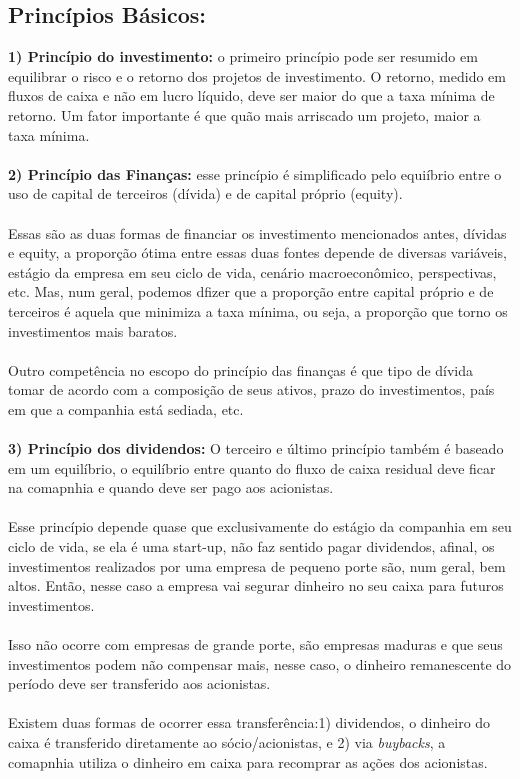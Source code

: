 \subsection*{Princípios Básicos:}
\textbf{1) Princípio do investimento:} o primeiro princípio pode ser resumido em equilibrar o risco e o retorno dos projetos de investimento. O retorno, medido em fluxos de caixa e não em lucro líquido, deve ser maior do que a taxa mínima de retorno. Um fator importante é que quão mais arriscado um projeto, maior a taxa mínima.
\\~\\
\textbf{2) Princípio das Finanças:} esse princípio é simplificado pelo equiíbrio entre o uso de capital de terceiros (dívida) e de capital próprio (equity).
\\~\\
Essas são as duas formas de financiar os investimento mencionados antes, dívidas e equity, a proporção ótima entre essas duas fontes depende de diversas variáveis, estágio da empresa em seu ciclo de vida, cenário macroeconômico, perspectivas, etc. Mas, num geral, podemos dfizer que a proporção entre capital próprio e de terceiros é aquela que minimiza a taxa mínima, ou seja, a proporção que torno os investimentos mais baratos.
\\~\\
Outro competência no escopo do princípio das finanças é que tipo de dívida tomar de acordo com a composição de seus ativos, prazo do investimentos, país em que a companhia está sediada, etc.
\\~\\
\textbf{3) Princípio dos dividendos: } O terceiro e último princípio também é baseado em um equilíbrio, o equilíbrio entre quanto do fluxo de caixa residual deve ficar na comapnhia e quando deve ser pago aos acionistas.
\\~\\
Esse princípio depende quase que exclusivamente do estágio da companhia em seu ciclo de vida, se ela é uma start-up, não faz sentido pagar dividendos, afinal, os investimentos realizados por uma empresa de pequeno porte são, num geral, bem altos. Então, nesse caso a empresa vai segurar dinheiro no seu caixa para futuros investimentos.
\\~\\
Isso não ocorre com empresas de grande porte, são empresas maduras e que seus investimentos podem não compensar mais, nesse caso, o dinheiro remanescente do período deve ser transferido aos acionistas. 
\\~\\
Existem duas formas de ocorrer essa transferência:1) dividendos, o dinheiro do caixa é transferido diretamente ao sócio/acionistas, e 2) via \textit{buybacks}, a comapnhia utiliza o dinheiro em caixa para recomprar as ações dos acionistas.

